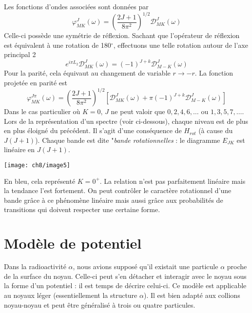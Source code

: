 Les fonctions d'ondes associées sont données par
\begin{equation}
\varphi_{MK}^J(\omega) = \left(\frac{2J+1}{8\pi^2}\right)^{1/2}\mathcal{D}_{MK}^J(\omega)
\end{equation}
Celle-ci possède une symétrie de réflexion. Sachant que l'opérateur de réflexion est équivalent à une rotation
de 180$^\circ$, effectuons une telle rotation autour de l'axe principal 2
\begin{equation}
e^{i\pi L_2}\mathcal{D}_{MK}^J(\omega) = (-1)^{J+k}\mathcal{D}_{M-K}^J(\omega)
\end{equation}
Pour la parité, cela équivaut au changement de variable $r\to -r$. La fonction projetée en parité est
\begin{equation}
\varphi_{MK}^{J\pi}(\omega) = \left(\frac{2J+1}{8\pi^2}\right)^{1/2} [\mathcal{D}_{MK}^J(\omega)+
\pi(-1)^{J+k}\mathcal{D}_{M-K}^J(\omega)]
\end{equation}
Dans le cas particulier où $K=0$, $J$ ne peut valoir que $0,2,4,6,\dots$ ou $1,3,5,7,\dots$. Lors de la 
représentation d'un spectre (voir ci-dessous), chaque niveau est de plus en plus éloigné
du précédent. Il s'agit d'une conséquence de $H_{rot}$ (à cause du $J(J+1)$). Chaque bande est dite "\textit{bande
rotationnelles} : le diagramme $E_{JK}$ est linéaire en $J(J+1)$.

\begin{center}
	\texttt{[image: ch8/image5]}
\end{center}

En bleu, cela représenté $K=0^+$. La relation n'est pas parfaitement linéaire mais la tendance l'est fortement. 
On peut contrôler le caractère rotationnel d'une bande grâce à ce phénomène linéaire mais aussi grâce aux
probabilités de transitions qui doivent respecter une certaine forme.



\section{Modèle de potentiel}
Dans la radioactivité $\alpha$, nous avions supposé qu'il existait une particule $\alpha$ proche de la surface
du noyau. Celle-ci peut s'en détacher et interagir avec le noyau sous la forme d'un potentiel : il est temps
de décrire celui-ci. Ce modèle est applicable au noyaux léger (essentiellement la structure $\alpha$). Il est
bien adapté aux collions noyau-noyau et peut être généralisé à trois ou quatre particules.\\

